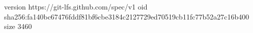 version https://git-lfs.github.com/spec/v1
oid sha256:fa140bc67476fddf81bf6cbe3184c2127729ed70519cb11fc77b52a27c16b400
size 3460

